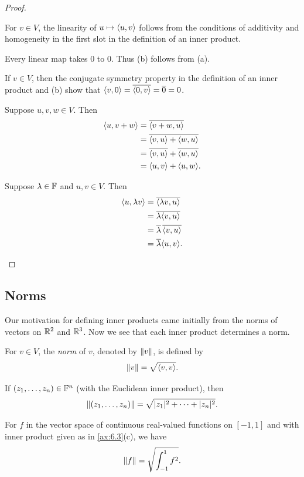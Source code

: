 \begin{proof}\leavevmode
\begin{parts}
\item For $v\in V$, the linearity of $u\mapsto\langle u, v \rangle$ follows from the
  conditions of additivity and homogeneity in the first slot in the definition
  of an inner product.
\item Every linear map takes $0$ to $0$. Thus (b) follows from (a).
\item If $v\in V$, then the conjugate symmetry property in the definition of an
  inner product and (b) show that
  $\langle v, 0 \rangle=\overline{\langle 0, v \rangle}=\overline{0}=0$.
\item Suppose $u,v,w\in V$. Then
  \begin{align*}
  \langle u, v+w \rangle &= \overline{\langle v+w, u \rangle}\\
    &= \overline{\langle v, u \rangle+\langle w, u \rangle}\\
    &= \overline{\langle v, u \rangle}+\overline{\langle w, u \rangle}\\
    &= \langle u, v \rangle+\langle u, w \rangle.
  \end{align*}
\item Suppose $\lambda\in\mathbb{F}$ and $u,v\in V$. Then
  \begin{align*}
  \langle u, \lambda v \rangle &= \overline{\langle \lambda v, u \rangle}\\
    &= \overline{\lambda\langle v, u \rangle}\\
    &= \overline{\lambda}\,\overline{\langle v, u \rangle}\\
    &= \overline{\lambda}\langle u, v \rangle. \qedhere
  \end{align*}
\end{parts}
\end{proof}

\subsection{Norms}

Our motivation for defining inner products came initially from the norms of
vectors on $\mathbb{R}^2$ and $\mathbb{R}^3$. Now we see that each inner product determines a
norm.

\begin{definition}\label{ax:6.7}
For $v\in V$, the \emph{norm} of $v$, denoted by $\lVert v \rVert$, is defined by
\[ \lVert v \rVert = \sqrt{\langle v, v \rangle}. \]
\end{definition}

\begin{example}[Norms]\label{ax:6.8}\leavevmode
\begin{parts}
\item If $(z_1,\dots,z_n)\in\mathbb{F}^n$ (with the Euclidean inner product), then
  \[ \lVert (z_1,\dots,z_n) \rVert = \sqrt{\lvert z_1 \rvert^2+\cdots+\lvert z_n \rvert^2}. \]
\item For $f$ in the vector space of continuous real-valued functions on
  $[-1,1]$ and with inner product given as in \ref{ax:6.3}(c), we have
  \[ \lVert f \rVert = \sqrt{\int_{-1}^1 f^2}. \]
\end{parts}
\end{example}


